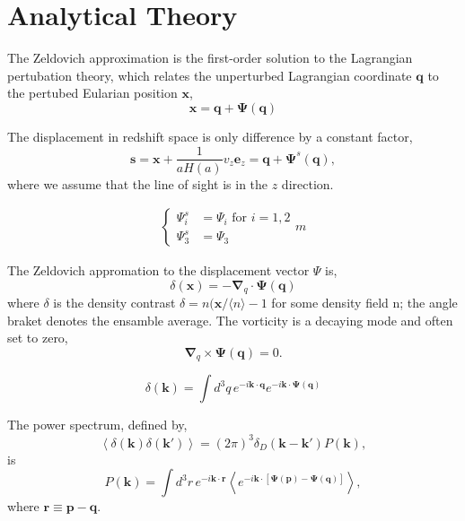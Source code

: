 \documentclass[a4paper,11pt]{article}
\begin{document}
\section{Analytical Theory}

The Zeldovich approximation is the first-order solution to the
Lagrangian pertubation theory, which relates the unperturbed
Lagrangian coordinate $\bm{q}$ to the pertubed Eularian position
$\bm{x}$,
\begin{equation}
  \bm{x} = \bm{q} + \bm{\Psi}(\bm{q})
\end{equation}

The displacement in redshift space is only difference by a constant factor,
\begin{equation}
  \bm{s} = \bm{x} + \frac{1}{aH(a)} v_z \bm{e}_z
         = \bm{q} + \bm{\Psi}^s(\bm{q}),
\end{equation}
where we assume that the line of sight is in the $z$ direction.

\begin{align}
  \begin{cases}
  \Psi_i^s &= \Psi_i \mbox{  for $i=1,2$}\\
  \Psi_3^s &= \Psi_3
  \end{cases}m
\end{align}

The Zeldovich appromation to the displacement vector $\Psi$ is,
\begin{equation}
  \delta(\bm{x}) = - \bm{\nabla}_q \cdot \bm{\Psi}(\bm{q})
\end{equation}
where $\delta$ is the density contrast $\delta = n(\bm{x}/\langle n
\rangle - 1$ for some density field n; the angle braket denotes the
ensamble average. The vorticity is a decaying mode and often set to zero,
\begin{equation}
  \bm{\nabla}_q \times \bm{\Psi}(\bm{q}) = 0.
\end{equation}

\begin{equation}
  \delta(\bm{k}) = \int d^3 q \, e^{-i \bm{k} \cdot \bm{q}}
                                 e^{-i \bm{k} \cdot \bm{\Psi}(\bm{q})}
\end{equation}

The power spectrum, defined by,
\begin{equation}
  \left\langle \delta(\bm{k}) \delta(\bm{k}') \right\rangle
  = (2\pi)^3 \delta_D(\bm{k} - \bm{k}') P(\bm{k}),
\end{equation}
is
\begin{equation}
  P(\bm{k}) = \int d^3 r \,  e^{-i \bm{k} \cdot \bm{r}} \left \langle
  e^{-i \bm{k} \cdot \left[ \bm{\Psi}(\bm{p}) - \bm{\Psi}(\bm{q}) \right]} \right \rangle,
\end{equation}
where $\bm{r} \equiv \bm{p} - \bm{q}$.
\end{document}
